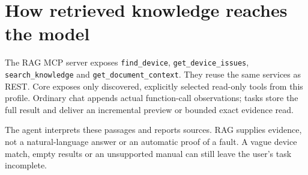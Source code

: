 \section*{How retrieved knowledge reaches the model}
The RAG MCP server exposes \texttt{find\_device}, \texttt{get\_device\_issues}, \texttt{search\_knowledge} and \texttt{get\_document\_context}. They reuse the same services as REST. Core exposes only discovered, explicitly selected read-only tools from this profile. Ordinary chat appends actual function-call observations; tasks store the full result and deliver an incremental preview or bounded exact evidence read.

The agent interprets these passages and reports sources. RAG supplies evidence, not a natural-language answer or an automatic proof of a fault. A vague device match, empty results or an unsupported manual can still leave the user's task incomplete.
